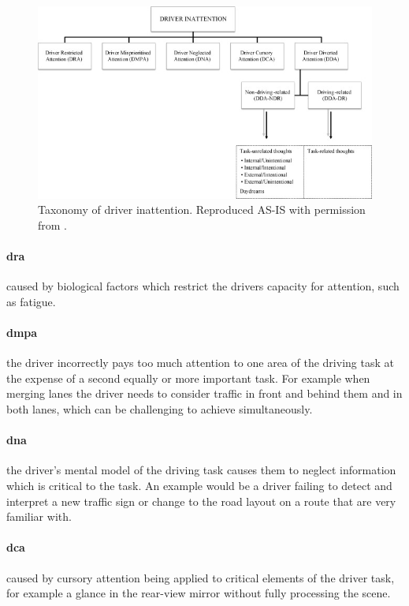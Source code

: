 \documentclass[11pt, parskip=half*,twoside=false]{scrbook}
\begin{document}
\begin{figure}[h]
	\centering
	\includegraphics[width=\textwidth]{driver_inattention_taxonomy} 
	\caption{Taxonomy of driver inattention. Reproduced AS-IS with permission from \citep{reganDriverDistractionDriver2011}.}
	\label{fig:taxonomy_inattention}
\end{figure}

\paragraph{\gls{dra}}caused by biological factors which restrict the drivers capacity for attention, such as fatigue. 

\paragraph{\gls{dmpa}} the driver incorrectly pays too much attention to one area of the driving task at the expense of a second equally or more important task. For example when merging lanes the driver needs to consider traffic in front and behind them and in both lanes, which can be challenging to achieve simultaneously.

\paragraph{\gls{dna}} the driver's mental model of the driving task causes them to neglect information which is critical to the task. An example would be a driver failing to detect and interpret a new traffic sign or change to the road layout on a route that are very familiar with. 

\paragraph{\gls{dca}} caused by cursory attention being applied to critical elements of the driver task, for example a glance in the rear-view mirror without fully processing the scene. 
\end{document}
